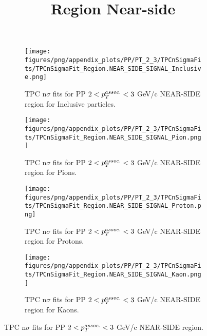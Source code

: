             \begin{figure}[H]
                \title{Region Near-side}
                \begin{subfigure}[b]{0.5\textwidth}
                    \centering
                    \texttt{[image: figures/png/appendix\_plots/PP/PT\_2\_3/TPCnSigmaFits/TPCnSigmaFit\_Region.NEAR\_SIDE\_SIGNAL\_Inclusive.png]}
                    \caption{TPC n$\sigma$ fits for PP $2 < \pTassoc < 3$ GeV/c NEAR-SIDE region for Inclusive particles.}
                    \label{fig:appendix_PP_$2 < \pTassoc < 3$ GeV/c_NEAR_SIDE_SIGNAL_Inclusive}
                \end{subfigure}
                \begin{subfigure}[b]{0.5\textwidth}
                    \centering
                    \texttt{[image: figures/png/appendix\_plots/PP/PT\_2\_3/TPCnSigmaFits/TPCnSigmaFit\_Region.NEAR\_SIDE\_SIGNAL\_Pion.png]}
                    \caption{TPC n$\sigma$ fits for PP $2 < \pTassoc < 3$ GeV/c NEAR-SIDE region for Pions.}
                    \label{fig:appendix_PP_$2 < \pTassoc < 3$ GeV/c_NEAR_SIDE_SIGNAL_Pion}
                \end{subfigure}
                \begin{subfigure}[b]{0.5\textwidth}
                    \centering
                    \texttt{[image: figures/png/appendix\_plots/PP/PT\_2\_3/TPCnSigmaFits/TPCnSigmaFit\_Region.NEAR\_SIDE\_SIGNAL\_Proton.png]}
                    \caption{TPC n$\sigma$ fits for PP $2 < \pTassoc < 3$ GeV/c NEAR-SIDE region for Protons.}
                    \label{fig:appendix_PP_$2 < \pTassoc < 3$ GeV/c_NEAR_SIDE_SIGNAL_Proton}
                \end{subfigure}
                \begin{subfigure}[b]{0.5\textwidth}
                    \centering
                    \texttt{[image: figures/png/appendix\_plots/PP/PT\_2\_3/TPCnSigmaFits/TPCnSigmaFit\_Region.NEAR\_SIDE\_SIGNAL\_Kaon.png]}
                    \caption{TPC n$\sigma$ fits for PP $2 < \pTassoc < 3$ GeV/c NEAR-SIDE region for Kaons.}
                    \label{fig:appendix_PP_$2 < \pTassoc < 3$ GeV/c_NEAR_SIDE_SIGNAL_Kaon}
                \end{subfigure}
                \caption{TPC n$\sigma$ fits for PP $2 < \pTassoc < 3$ GeV/c NEAR-SIDE region.}
                \label{fig:appendix_PP_$2 < \pTassoc < 3$ GeV/c_NEAR_SIDE_SIGNAL}
            \end{figure}
